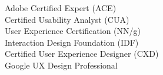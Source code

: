 \documentclass[letterpaper]{resume} %
\begin{document}
\begin{minipage}[t]{0.66\textwidth}
Adobe Certified Expert (ACE) \\
Certified Usability Analyst (CUA) \\
User Experience Certification (NN/g) \\
Interaction Design Foundation (IDF) \\
Certified User Experience Designer (CXD) \\
Google UX Design Professional

\sectionspace %
\sectionspace


\end{minipage} %








\end{document}

